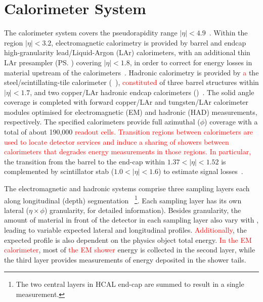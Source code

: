 \section{Calorimeter System}\label{ssec:calo}


%



The calorimeter system covers the pseudorapidity
range \(|\eta| < 4.9\)~\cite{PERF-2007-01}. Within the region \(|\eta|< 3.2\),
electromagnetic calorimetry is provided by barrel and endcap high-granularity
lead/Liquid-Argon (LAr) calorimeters, with an additional thin LAr presampler
(\ps) covering \(|\eta| < 1.8\), in order to correct for energy losses in
material upstream of the calorimeters~\cite{LARG-2009-01,larg_tdr}. Hadronic
calorimetry is provided by \textcolor{red}{a} the steel/scintillating-tile calorimeter
(\tilecal~\cite{TCAL-2017-01,tile_tdr}), \textcolor{red}{constituted} of three barrel structures
within \(|\eta| < 1.7\), and two copper/LAr hadronic endcap calorimeters
(\hec)~\cite{cal_tdr}.  The solid angle coverage is completed with forward
copper/LAr and tungsten/LAr calorimeter modules optimised for electromagnetic
(EM) and hadronic (HAD) measurements, respectively. The specified calorimeters
provide full azimuthal ($\phi$) coverage with a total of about 190,000 \textcolor{red}{readout cells. Transition regions between calorimeters are used to locate detector services and induce a sharing of showers between calorimeters that degrades energy measurements in those regions. In particular,} the transition from the barrel to the end-cap within
$1.37<|\eta|<1.52$ is complemented by scintillator stab ($1.0<|\eta|<1.6$) to
estimate signal losses~\cite{cal_tdr}.

The electromagnetic and hadronic systems comprise three sampling layers each along longitudinal (depth) segmentation ~\cite{PERF-2007-01}\footnote{The two
central layers in HCAL end-cap are summed to result in a single measurement.}.
Each sampling layer has its own lateral ($\eta\times\phi$) granularity, for detailed information). Besides granularity, the amount of material in front of the detector in each sampling layer also vary with \abseta, leading to variable expected lateral and longitudinal profiles. \textcolor{red}{Additionally}, the expected
profile is also dependent on the physics object total energy. \textcolor{red}{In the EM calorimeter}, most of \textcolor{red}{the EM shower} energy is collected in the second layer, while the third layer provides measurements
of energy deposited in the shower tails. %

